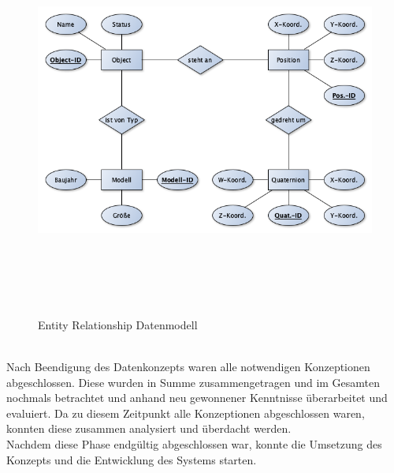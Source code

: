 \begin{figure}[hbt!]
    \centering
    \includegraphics[width=13cm,height=13cm,keepaspectratio]{3Konzeption/Bilder/ERM_BA.png}
    \caption{Entity Relationship Datenmodell}
    \label{pic:erm}
\end{figure}
\\
Nach Beendigung des Datenkonzepts waren alle notwendigen Konzeptionen abgeschlossen. Diese wurden in Summe zusammengetragen und im Gesamten nochmals 
betrachtet und anhand neu gewonnener Kenntnisse überarbeitet und evaluiert. Da zu diesem Zeitpunkt alle Konzeptionen abgeschlossen 
waren, konnten diese zusammen analysiert und überdacht werden. 
\\ 
\linebreak
Nachdem diese Phase endgültig abgeschlossen war, konnte die Umsetzung des Konzepts und die 
Entwicklung des Systems starten. 